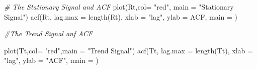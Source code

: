 \documentclass[
  onepage,
  openany]{scrbook}
\newenvironment{Shaded}{}{}
\newcommand{\AttributeTok}[1]{\textcolor[rgb]{0.49,0.56,0.16}{#1}}
\newcommand{\CommentTok}[1]{\textcolor[rgb]{0.38,0.63,0.69}{\textit{#1}}}
\newcommand{\FunctionTok}[1]{\textcolor[rgb]{0.02,0.16,0.49}{#1}}
\newcommand{\NormalTok}[1]{#1}
\newcommand{\StringTok}[1]{\textcolor[rgb]{0.25,0.44,0.63}{#1}}
\begin{document}
\begin{Shaded}
\begin{Highlighting}[]
\CommentTok{\# The Stationary Signal and ACF}
\FunctionTok{plot}\NormalTok{(Rt,}\AttributeTok{col=} \StringTok{"red"}\NormalTok{, }\AttributeTok{main =} \StringTok{"Stationary Signal"}\NormalTok{)}
\FunctionTok{acf}\NormalTok{(Rt, }\AttributeTok{lag.max =} \FunctionTok{length}\NormalTok{(Rt),}
    \AttributeTok{xlab =} \StringTok{"lag"}\NormalTok{, }\AttributeTok{ylab =} \StringTok{\textquotesingle{}ACF\textquotesingle{}}\NormalTok{, }\AttributeTok{main =} \StringTok{\textquotesingle{}\textquotesingle{}}\NormalTok{)}

\CommentTok{\#The Trend Signal anf ACF}

\FunctionTok{plot}\NormalTok{(Tt,}\AttributeTok{col=} \StringTok{"red"}\NormalTok{,}\AttributeTok{main =} \StringTok{"Trend Signal"}\NormalTok{)}
\FunctionTok{acf}\NormalTok{(Tt, }\AttributeTok{lag.max =} \FunctionTok{length}\NormalTok{(Tt),}
    \AttributeTok{xlab =} \StringTok{"lag"}\NormalTok{, }\AttributeTok{ylab =} \StringTok{"ACF"}\NormalTok{, }\AttributeTok{main =} \StringTok{\textquotesingle{}\textquotesingle{}}\NormalTok{)}
\end{Highlighting}
\end{Shaded}
\end{document}
